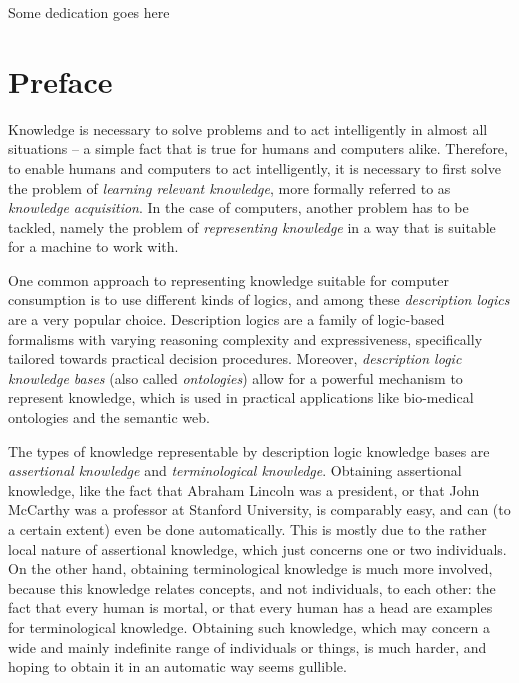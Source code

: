 \vspace*{0.38196601125\textheight}
\begin{center}
  Some dedication goes here
\end{center}

\chapter*{Preface}
\label{cha:preface}

\thispagestyle{empty}

Knowledge is necessary to solve problems and to act intelligently in almost all situations
-- a simple fact that is true for humans and computers alike.  Therefore, to enable humans
and computers to act intelligently, it is necessary to first solve the problem of
\emph{learning relevant knowledge}, more formally referred to as \emph{knowledge
  acquisition}.  In the case of computers, another problem has to be tackled, namely the
problem of \emph{representing knowledge} in a way that is suitable for a machine to work
with.

One common approach to representing knowledge suitable for computer consumption is to use
different kinds of logics, and among these \emph{description logics} are a very popular
choice.  Description logics are a family of logic-based formalisms with varying reasoning
complexity and expressiveness, specifically tailored towards practical decision
procedures.  Moreover, \emph{description logic knowledge bases} (also called
\emph{ontologies}) allow for a powerful mechanism to represent knowledge, which is used in
practical applications like bio-medical ontologies and the semantic web.

The types of knowledge representable by description logic knowledge bases are
\emph{assertional knowledge} and \emph{terminological knowledge}.  Obtaining assertional
knowledge, like the fact that Abraham Lincoln was a president, or that John McCarthy was a
professor at Stanford University, is comparably easy, and can (to a certain extent) even
be done automatically.  This is mostly due to the rather local nature of assertional
knowledge, which just concerns one or two individuals.  On the other hand, obtaining
terminological knowledge is much more involved, because this knowledge relates concepts,
and not individuals, to each other: the fact that every human is mortal, or that every
human has a head are examples for terminological knowledge.  Obtaining such knowledge,
which may concern a wide and mainly indefinite range of individuals or things, is much
harder, and hoping to obtain it in an automatic way seems gullible.

